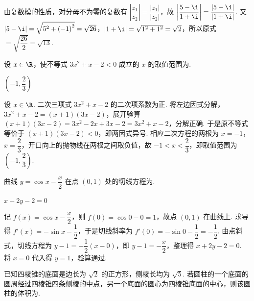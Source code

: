 \begin{solution}
由复数模的性质，对分母不为零的复数有 \(\left|\dfrac{z_{1}}{z_{2}}\right|=\dfrac{|z_{1}|}{|z_{2}|}\)，故 \(\left|\dfrac{5-\i}{1+\i}\right|=\dfrac{|5-\i|}{|1+\i|}\). 又 \(|5-\i|=\sqrt{5^{2}+\left(-1\right)^{2}}=\sqrt{26}\)，\(|1+\i|=\sqrt{1^{2}+1^{2}}=\sqrt{2}\)，所以原式\(=\sqrt{\dfrac{26}{2}}=\sqrt{13}\).
\end{solution}

\begin{problem}
设 \(x\in\R\)，使不等式 \(3x^2+x-2<0\) 成立的 \(x\) 的取值范围为\fillinblank{}.
\end{problem}

\begin{answer}
\(\left(-1,\dfrac{2}{3}\right)\)
\end{answer}

\begin{solution}
设 \(x\in\R\). 二次三项式 \(3x^{2}+x-2\) 的二次项系数为正. 将左边因式分解，\(3x^{2}+x-2=\left(x+1\right)\left(3x-2\right)\)，展开验算 \(\left(x+1\right)\left(3x-2\right)=3x^{2}-2x+3x-2=3x^{2}+x-2\)，分解正确. 于是原不等式等价于 \(\left(x+1\right)\left(3x-2\right)<0\)，即两因式异号. 相应二次方程的两根为 \(x=-1\)，\(x=\dfrac{2}{3}\)，开口向上的抛物线在两根之间取负值，故 \(-1<x<\dfrac{2}{3}\)，即取值范围为 \(\left(-1,\dfrac{2}{3}\right)\).
\end{solution}

\begin{problem}
曲线 \(y=\cos x-\dfrac x2\) 在点 \((0,1)\) 处的切线方程为\fillinblank{}.
\end{problem}

\begin{answer}
\(x+2y-2=0\)
\end{answer}

\begin{solution}
记 \(f\left(x\right)=\cos x-\dfrac{x}{2}\)，则 \(f\left(0\right)=\cos 0-0=1\)，故点 \(\left(0,1\right)\) 在曲线上. 求导得 \(f'\left(x\right)=-\sin x-\dfrac{1}{2}\)，于是切线斜率为 \(f'\left(0\right)=-\sin 0-\dfrac{1}{2}=-\dfrac{1}{2}\). 由点斜式，切线方程为 \(y-1=-\dfrac{1}{2}\left(x-0\right)\)，即 \(y-1=-\dfrac{x}{2}\)，整理得 \(x+2y-2=0\). 将 \(x=0\) 代入得 \(y=1\)，验算通过.
\end{solution}

\begin{problem}
已知四棱锥的底面是边长为 \(\sqrt2\) 的正方形，侧棱长均为 \(\sqrt5\). 若圆柱的一个底面的圆周经过四棱锥四条侧棱的中点，另一个底面的圆心为四棱锥底面的中心，则该圆柱的体积为\fillinblank{}.
\end{problem}

